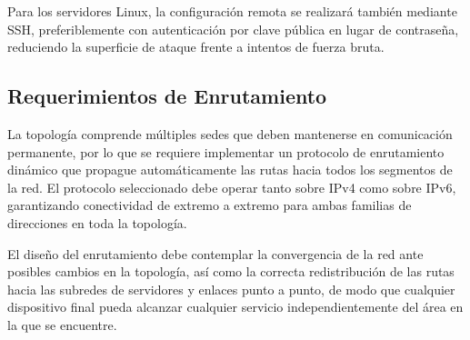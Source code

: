Para los servidores Linux, la configuración remota se realizará también mediante
SSH, preferiblemente con autenticación por clave pública en lugar de contraseña,
reduciendo la superficie de ataque frente a intentos de fuerza bruta.

\subsection{Requerimientos de Enrutamiento}

La topología comprende múltiples sedes que deben mantenerse en comunicación
permanente, por lo que se requiere implementar un protocolo de enrutamiento
dinámico que propague automáticamente las rutas hacia todos los segmentos de
la red. El protocolo seleccionado debe operar tanto sobre IPv4 como sobre IPv6,
garantizando conectividad de extremo a extremo para ambas familias de direcciones
en toda la topología.

El diseño del enrutamiento debe contemplar la convergencia de la red ante posibles
cambios en la topología, así como la correcta redistribución de las rutas hacia
las subredes de servidores y enlaces punto a punto, de modo que cualquier
dispositivo final pueda alcanzar cualquier servicio independientemente del área
en la que se encuentre.